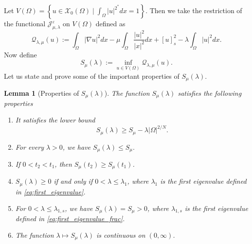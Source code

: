 \documentclass[11pt]{article}
\newtheorem{lemma}{Lemma}[section] %
\newcommand{\om} {\Omega}
\newcommand{\la} {\lambda}
\newcommand{\X}{\mathcal{X}_0} %
\newcommand{\Je}{\mathcal{J}_{\mu,\lambda}^{\varepsilon}} %
\newcommand{\Q}{\mathcal{Q}_{\la,\mu}}
\begin{document}
Let $V(\om) = \left\{ u \in \X(\Omega) \mid \int_{\Omega} |u|^{2^*} dx= 1 \right\}$. Then we take the restriction of the functional $\Je$ on $V(\om)$ defined as 
\begin{equation*}
    \Q(u) := \int_{\Omega} |\nabla u|^2dx - \mu \int_{\Omega} \frac{|u|^2}{|x|^2} dx + [u]_s^2 - \lambda \int_{\Omega} |u|^2dx.
\end{equation*}
Now define
\begin{equation*}
S_{\mu}(\lambda) := \inf_{u \in V(\om)} \Q(u).
\end{equation*}
Let us state and prove some of the important properties of $S_{\mu}(\lambda)$.
\begin{lemma}[Properties of $S_{\mu}(\lambda)$]\label{lem:best_constant_being_constant}
The function $S_{\mu}(\lambda)$ satisfies the following properties
\begin{enumerate}
    \item It satisfies the lower bound
    \begin{equation*}
    S_{\mu}(\lambda) \geq S_{\mu} - \lambda |\Omega|^{2/N}.
    \end{equation*}
    
    \item For every $\lambda > 0$, we have $S_{\mu}(\lambda) \leq S_{\mu}.$

    \item If $0 < t_2 < t_{1}$, then $ S_{\mu}(t_2) \geq S_{\mu}(t_1)$.
    \item $S_{\mu}(\la) \geq 0$ if and only if $0 < \la \leq \la_1$, where $\la_1$ is the first eigenvalue defined in \eqref{eq:first_eigenvalue}.
    \item For $0 < \lambda \leq \lambda_{1, s}$, we have $S_{\mu}(\lambda) = S_{\mu} > 0$, where $\la_{1,s}$ is the first eigenvalue defined in \eqref{eq:first_eigenvalue_frac}.
    \item The function $\lambda \mapsto S_{\mu}(\lambda)$ is continuous on $(0, \infty)$.
\end{enumerate}
\end{lemma}
\end{document}
